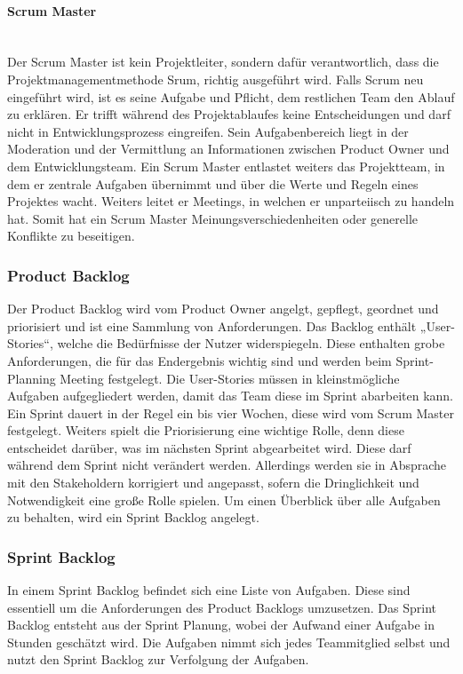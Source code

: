 \paragraph{Scrum Master}
\leavevmode \\
Der Scrum Master ist kein Projektleiter, sondern dafür verantwortlich, dass die Projektmanagementmethode Srum, richtig ausgeführt wird. Falls Scrum neu eingeführt wird, ist es seine Aufgabe und Pflicht, dem restlichen Team den Ablauf zu erklären. Er trifft während des Projektablaufes keine Entscheidungen und darf nicht in Entwicklungsprozess eingreifen. Sein Aufgabenbereich liegt in der Moderation und der Vermittlung an Informationen zwischen Product Owner und dem Entwicklungsteam. Ein Scrum Master entlastet weiters das Projektteam, in dem er zentrale Aufgaben übernimmt und über die Werte und Regeln eines Projektes wacht. Weiters leitet er Meetings, in welchen er unparteiisch zu handeln hat. Somit hat ein Scrum Master Meinungsverschiedenheiten oder generelle Konflikte zu beseitigen. 

\subsubsection{Product Backlog} 
Der Product Backlog wird vom Product Owner angelgt, gepflegt, geordnet und priorisiert und ist eine Sammlung von Anforderungen. Das Backlog enthält „User-Stories“, welche die Bedürfnisse der Nutzer widerspiegeln. Diese enthalten grobe Anforderungen, die für das Endergebnis wichtig sind und werden beim Sprint-Planning Meeting festgelegt. Die User-Stories müssen in kleinstmögliche Aufgaben aufgegliedert werden, damit das Team diese im Sprint abarbeiten kann. Ein Sprint dauert in der Regel ein bis vier Wochen, diese wird vom Scrum Master festgelegt. Weiters spielt die Priorisierung eine wichtige Rolle, denn diese entscheidet darüber, was im nächsten Sprint abgearbeitet wird. Diese darf während dem Sprint nicht verändert werden. Allerdings werden sie in Absprache mit den Stakeholdern korrigiert und angepasst, sofern die Dringlichkeit und Notwendigkeit eine große Rolle spielen. Um einen Überblick über alle Aufgaben zu behalten, wird ein Sprint Backlog angelegt. 

\subsubsection{Sprint Backlog} 
In einem Sprint Backlog befindet sich eine Liste von Aufgaben. Diese sind essentiell um die Anforderungen des Product Backlogs umzusetzen. Das Sprint Backlog entsteht aus der Sprint Planung, wobei der Aufwand einer Aufgabe in Stunden geschätzt wird. Die Aufgaben nimmt sich jedes Teammitglied selbst und nutzt den Sprint Backlog zur Verfolgung der Aufgaben. 

